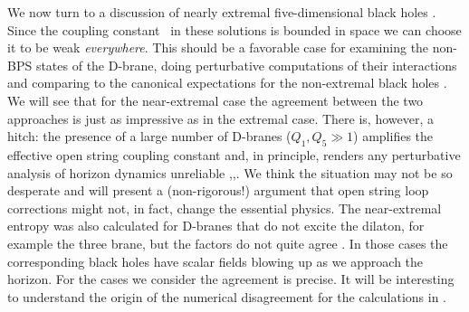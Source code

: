 We now turn to a discussion of nearly  extremal five-dimensional
black holes \solnfd .
Since the coupling constant \dil\ in these solutions is bounded  in space
we can choose it to be weak {\it everywhere}. 
This should be a favorable case
for examining the non-BPS states of the D-brane, doing perturbative
computations of their
interactions and comparing to the canonical expectations for the 
non-extremal
black holes \solnfd .
 We will see that for the near-extremal case the
 agreement between the two approaches
is just as impressive as in the extremal case. There is, however, a hitch:
the presence of a large number of D-branes ($Q_1, Q_5 \gg 1$) amplifies the
effective open string coupling constant and, in principle, renders any
perturbative analysis of horizon dynamics unreliable
\sv ,\hstro ,\polchinskinotes . We think the situation may not be so
desperate and will present  a (non-rigorous!) argument that
open string loop corrections might not, 
in fact, change the essential physics.
The near-extremal entropy was also calculated for D-branes that 
do not excite the dilaton, for example the three brane, but
the factors do not quite agree \gkp \klts . In those cases the
corresponding black holes have scalar fields blowing up as we 
approach the horizon. For the cases we consider the 
agreement is precise. It will be interesting to 
understand the origin of the numerical 
disagreement for the calculations
in \gkp \klts . 


